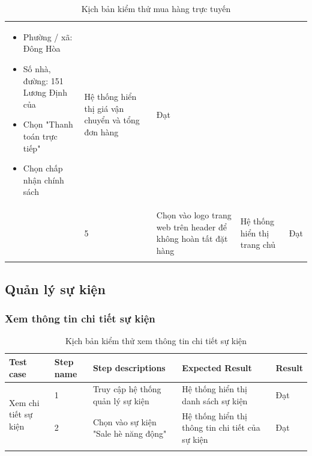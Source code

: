 {\begin{longtable}{| p{2.5cm}| p{1cm}| p{5.5cm}| p{4.5cm} | p{1.5cm} |}
\begin{itemize}
            \item Phường / xã: Đông Hòa
            \item Số nhà, đường: 151 Lương Định của
            \item Chọn "Thanh toán trực tiếp"
            \item Chọn chấp nhận chính sách
        \end{itemize}
                                                                                                        &
        Hệ thống hiển thị giá vận chuyển và tổng đơn hàng                                               &
        Đạt                                                                                                                                                                                            \\
        \cline{2-5}
                                                                                                        & 5                  &
        Chọn vào logo trang web trên header để không hoàn tất đặt hàng                                  &
        Hệ thống hiển thị trang chủ                                                                     &
        Đạt                                                                                                                                                                                            \\
        \hline
        \caption{Kịch bản kiểm thử mua hàng trực tuyến}
    \end{longtable}
}

\subsection{Quản lý sự kiện}

\subsubsection{Xem thông tin chi tiết sự kiện}
{
    \setlength\extrarowheight{6pt}
    \begin{longtable}{| p{2.5cm}| p{1cm}| p{5.5cm}| p{4.5cm} | p{1.5cm} |}
        \hline
        \textbf{Test case}                           & \textbf{Step name} & \textbf{Step descriptions}           & \textbf{Expected Result}                         & \textbf{Result} \\
        \hline
        \multirow[c]{2}{2.5cm}{Xem chi tiết sự kiện} & 1                  & Truy cập hệ thống quản lý sự kiện    & Hệ thống hiển thị danh sách sự kiện              & Đạt             \\
        \cline{2-5}
                                                     & 2                  & Chọn vào sự kiện "Sale hè năng động" & Hệ thống hiển thị thông tin chi tiết của sự kiện & Đạt             \\
        \hline
        \caption{Kịch bản kiểm thử xem thông tin chi tiết sự kiện}
    \end{longtable}
}

